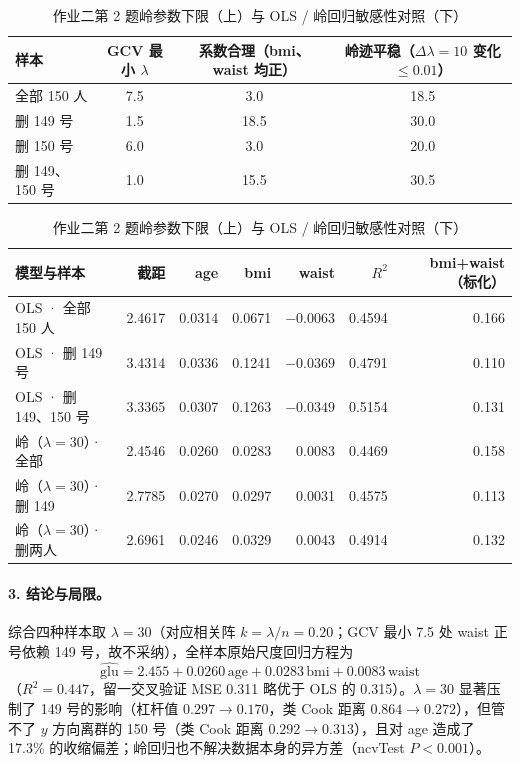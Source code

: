 \begin{table}[htbp]
\centering\small
\caption{作业二第 2 题岭参数下限（上）与 OLS / 岭回归敏感性对照（下）}
\begin{tabular}{@{}lccc@{}}
\toprule
样本 & GCV 最小 $\lambda$ & 系数合理（bmi、waist 均正） & 岭迹平稳（$\Delta\lambda=10$ 变化 $\le 0.01$）\\
\midrule
全部 150 人      & 7.5 & 3.0  & 18.5\\
删 149 号        & 1.5 & 18.5 & 30.0\\
删 150 号        & 6.0 & 3.0  & 20.0\\
删 149、150 号   & 1.0 & 15.5 & 30.5\\
\bottomrule
\end{tabular}

\vspace{0.8em}
\begin{tabular}{@{}lrrrrrr@{}}
\toprule
模型与样本 & 截距 & age & bmi & waist & $R^2$ & bmi+waist（标化）\\
\midrule
OLS · 全部 150 人     & 2.4617 & 0.0314 & 0.0671 & $-0.0063$ & 0.4594 & 0.166\\
OLS · 删 149 号       & 3.4314 & 0.0336 & 0.1241 & $-0.0369$ & 0.4791 & 0.110\\
OLS · 删 149、150 号  & 3.3365 & 0.0307 & 0.1263 & $-0.0349$ & 0.5154 & 0.131\\
\midrule
岭（$\lambda=30$）· 全部 & 2.4546 & 0.0260 & 0.0283 & 0.0083 & 0.4469 & 0.158\\
岭（$\lambda=30$）· 删 149 & 2.7785 & 0.0270 & 0.0297 & 0.0031 & 0.4575 & 0.113\\
岭（$\lambda=30$）· 删两人 & 2.6961 & 0.0246 & 0.0329 & 0.0043 & 0.4914 & 0.132\\
\bottomrule
\end{tabular}
\end{table}

\paragraph{3. 结论与局限。}综合四种样本取 $\lambda=30$（对应相关阵 $k=\lambda/n=0.20$；GCV 最小 7.5 处 waist 正号依赖 149 号，故不采纳），全样本原始尺度回归方程为
\[
\widehat{\text{glu}}=2.455+0.0260\,\text{age}+0.0283\,\text{bmi}+0.0083\,\text{waist}
\]
（$R^2=0.447$，留一交叉验证 MSE 0.311 略优于 OLS 的 0.315）。$\lambda=30$ 显著压制了 149 号的影响（杠杆值 $0.297\to 0.170$，类 Cook 距离 $0.864\to 0.272$），但管不了 $y$ 方向离群的 150 号（类 Cook 距离 $0.292\to 0.313$），且对 age 造成了 17.3\% 的收缩偏差；岭回归也不解决数据本身的异方差（ncvTest $P<0.001$）。

